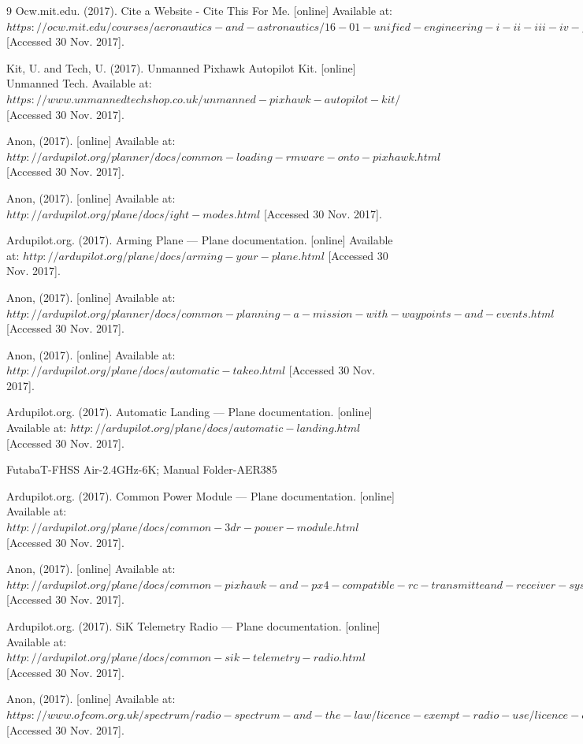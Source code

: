\documentclass[12pt]{article}
\begin{document}
\begin{thebibliography}{9}
Ocw.mit.edu. (2017). Cite a Website - Cite This For Me. [online] Available at: $https://ocw.mit.edu/courses/aeronautics-and-astronautics/16-01-unified-engineering-i-ii-iii-iv-fall-2005-spring-2006/systems-labs-06/spl8.pdf$ [Accessed 30 Nov. 2017].

Kit, U. and Tech, U. (2017). Unmanned Pixhawk Autopilot Kit. [online] Unmanned Tech. Available at: $https://www.unmannedtechshop.co.uk/unmanned-pixhawk-autopilot-kit/$ [Accessed 30 Nov. 2017].

Anon, (2017). [online] Available at: $http://ardupilot.org/planner/docs/common-loading-rmware-onto-pixhawk.html$ [Accessed 30 Nov. 2017].

Anon, (2017). [online] Available at: $http://ardupilot.org/plane/docs/ ight-modes.html$ [Accessed 30 Nov. 2017].

Ardupilot.org. (2017). Arming Plane — Plane documentation. [online] Available at: $http://ardupilot.org/plane/docs/arming-your-plane.html$ [Accessed 30 Nov. 2017].

Anon, (2017). [online] Available at: $http://ardupilot.org/planner/docs/common-planning-a-mission-with-waypoints- and-events.html$ [Accessed 30 Nov. 2017].

Anon, (2017). [online] Available at: $http://ardupilot.org/plane/docs/automatic-takeo .html$ [Accessed 30 Nov. 2017].

Ardupilot.org. (2017). Automatic Landing — Plane documentation. [online] Available at: $http://ardupilot.org/plane/docs/automatic-landing.html$ [Accessed 30 Nov. 2017].

FutabaT-FHSS Air-2.4GHz-6K; Manual Folder-AER385

Ardupilot.org. (2017). Common Power Module — Plane documentation. [online] Available at: $http://ardupilot.org/plane/docs/common-3dr-power-module.html$ [Accessed 30 Nov. 2017].

Anon, (2017). [online] Available at:$ http://ardupilot.org/plane/docs/common-pixhawk-and-px4-compatible-rc-transmitte and-receiver-systems.html$ [Accessed 30 Nov. 2017].

Ardupilot.org. (2017). SiK Telemetry Radio — Plane documentation. [online] Available at: $http://ardupilot.org/plane/docs/common-sik-telemetry-radio.html$ [Accessed 30 Nov. 2017].

Anon, (2017). [online] Available at: $https://www.ofcom.org.uk/spectrum/radio-spectrum-and-the-law/licence-exempt- radio-use/licence-exempt-devices/short-range-devices-information$ [Accessed 30 Nov. 2017].


\end{thebibliography}
\end{document}
